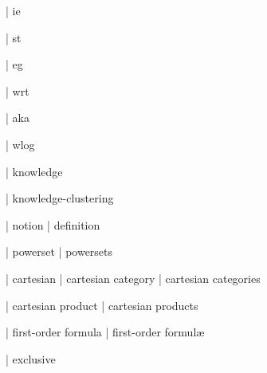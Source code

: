 
  | ie

  | st

  | eg

  | wrt

  | aka

  | wlog


  | knowledge

 | knowledge-clustering

 | notion
 | definition

  | powerset
  | powersets

  | cartesian
  | cartesian category
  | cartesian categories

  | cartesian product
  | cartesian products

  | first-order formula
  | first-order formul\ae{}

  | exclusive


